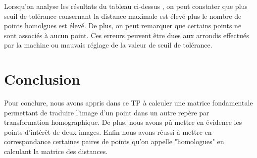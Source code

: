 \documentclass[a4paper,12pt]{report}
\begin{document}
\noindent Lorsqu'on analyse les résultats du tableau ci-dessus , on peut constater que plus seuil de tolérance consernant la distance maximale est élevé plus le nombre de points homolgues est élevé. De plus, on peut remarquer que certains points ne sont associés à aucun point. Ces erreurs peuvent être dues aux arrondis effectués par la machine ou mauvais réglage de la valeur de seuil de tolérance.

\section*{Conclusion}
Pour conclure, nous avons appris dans ce TP à calculer une matrice fondamentale permettant de traduire l'image d'un point dans un autre repère par transformation homographique. De plus, nous avons pû mettre en évidence les points d'intérêt de deux images. Enfin nous avons réussi à mettre en correspondance certaines paires de points qu'on appelle "homologues" en calculant la matrice des distances.
\end{document}
